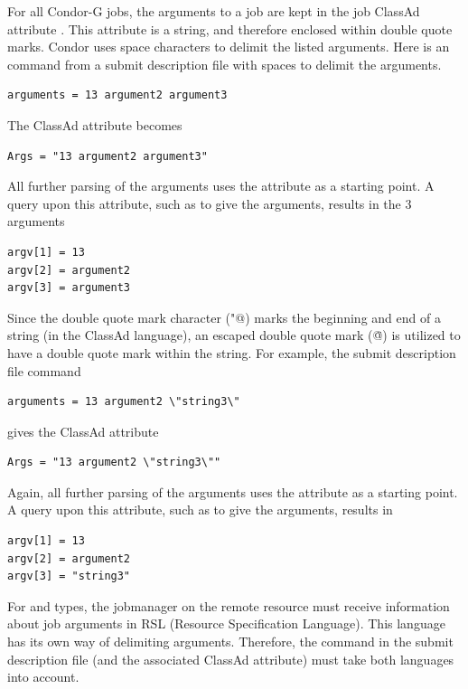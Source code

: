 For all Condor-G jobs,
the arguments to a job are kept in the job ClassAd attribute
.
This attribute is a string, and therefore enclosed within
double quote marks.
Condor uses space characters to delimit the listed
arguments.
Here is an  command from a submit
description file with spaces to delimit the arguments.
\footnotesize
\begin{verbatim}
arguments = 13 argument2 argument3
\end{verbatim}
\normalsize
The  ClassAd attribute becomes
\footnotesize
\begin{verbatim}
Args = "13 argument2 argument3"
\end{verbatim}
\normalsize
All further parsing of the arguments uses the 
attribute as a starting point.
A query upon this attribute, such as to give the arguments,
results in the 3 arguments
\begin{verbatim}
argv[1] = 13
argv[2] = argument2
argv[3] = argument3
\end{verbatim}

Since the double quote mark character (\verb@"@) marks the
beginning and end of a string (in the ClassAd language),
an escaped double quote mark (\verb@\"@) is utilized to have
a double quote mark within the string.
For example,
the submit description file  command
\footnotesize
\begin{verbatim}
arguments = 13 argument2 \"string3\"
\end{verbatim}
\normalsize
gives the ClassAd attribute
\footnotesize
\begin{verbatim}
Args = "13 argument2 \"string3\""
\end{verbatim}
\normalsize
Again, all further parsing of the arguments uses the 
attribute as a starting point.
A query upon this attribute, such as to give the arguments,
results in
\begin{verbatim}
argv[1] = 13
argv[2] = argument2
argv[3] = "string3"
\end{verbatim}

For 
 and  types,
the jobmanager on the remote resource
must receive information about job arguments
in RSL (Resource Specification Language).
This language has its own way of delimiting arguments.
Therefore, the  command in the
submit description file (and the associated ClassAd
attribute) must take both languages into account.

